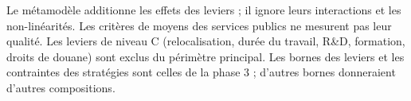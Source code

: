 \begin{limites}
Le métamodèle additionne les effets des leviers ; il ignore leurs interactions et les non-linéarités. Les critères de
moyens des services publics ne mesurent pas leur qualité. Les leviers de niveau C (relocalisation, durée du travail, R\&D,
formation, droits de douane) sont exclus du périmètre principal. Les bornes des leviers et les contraintes des
stratégies sont celles de la phase 3 ; d'autres bornes donneraient d'autres compositions.
\end{limites}

